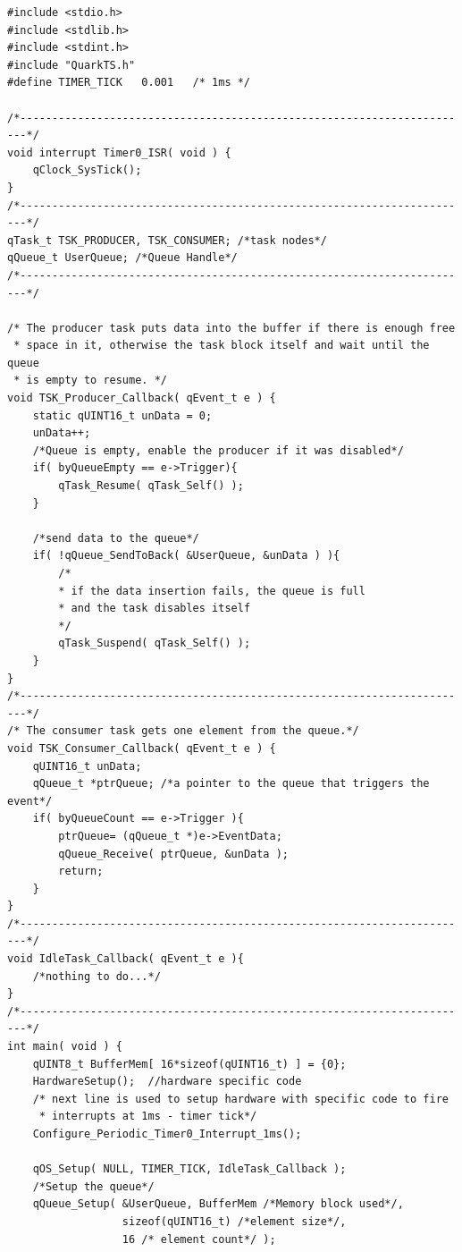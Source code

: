 \documentclass{article}
\begin{document}
\begin{lstlisting}[style=CStyle]
#include <stdio.h>
#include <stdlib.h>
#include <stdint.h>
#include "QuarkTS.h"
#define TIMER_TICK   0.001   /* 1ms */ 

/*-----------------------------------------------------------------------*/
void interrupt Timer0_ISR( void ) {
    qClock_SysTick();   
}
/*-----------------------------------------------------------------------*/
qTask_t TSK_PRODUCER, TSK_CONSUMER; /*task nodes*/
qQueue_t UserQueue; /*Queue Handle*/
/*-----------------------------------------------------------------------*/

/* The producer task puts data into the buffer if there is enough free 
 * space in it, otherwise the task block itself and wait until the queue 
 * is empty to resume. */
void TSK_Producer_Callback( qEvent_t e ) {
    static qUINT16_t unData = 0;
    unData++;	
    /*Queue is empty, enable the producer if it was disabled*/
    if( byQueueEmpty == e->Trigger){
        qTask_Resume( qTask_Self() );
    }

    /*send data to the queue*/
    if( !qQueue_SendToBack( &UserQueue, &unData ) ){ 
        /*
        * if the data insertion fails, the queue is full 
        * and the task disables itself
        */
	    qTask_Suspend( qTask_Self() ); 
    }
}
/*-----------------------------------------------------------------------*/
/* The consumer task gets one element from the queue.*/
void TSK_Consumer_Callback( qEvent_t e ) {
    qUINT16_t unData;
    qQueue_t *ptrQueue; /*a pointer to the queue that triggers the event*/
    if( byQueueCount == e->Trigger ){
	    ptrQueue= (qQueue_t *)e->EventData;
	    qQueue_Receive( ptrQueue, &unData );
	    return;
    }
}
/*-----------------------------------------------------------------------*/
void IdleTask_Callback( qEvent_t e ){
    /*nothing to do...*/
}	
/*-----------------------------------------------------------------------*/
int main( void ) {    
    qUINT8_t BufferMem[ 16*sizeof(qUINT16_t) ] = {0};  
    HardwareSetup();  //hardware specific code
    /* next line is used to setup hardware with specific code to fire
     * interrupts at 1ms - timer tick*/
    Configure_Periodic_Timer0_Interrupt_1ms();
 
    qOS_Setup( NULL, TIMER_TICK, IdleTask_Callback );     
    /*Setup the queue*/
    qQueue_Setup( &UserQueue, BufferMem /*Memory block used*/, 
                  sizeof(qUINT16_t) /*element size*/, 
                  16 /* element count*/ );     
                 

\end{lstlisting}
\end{document}
